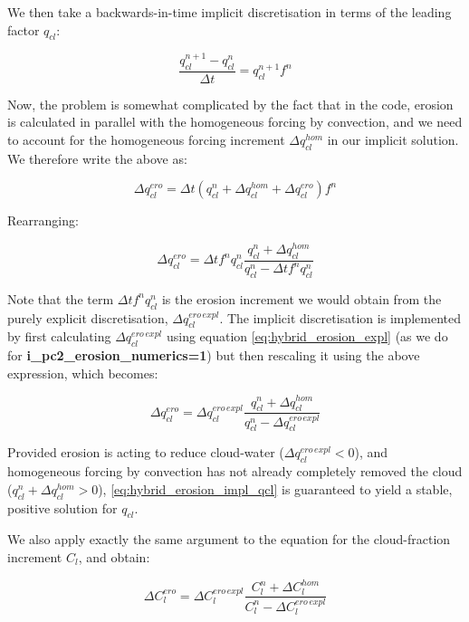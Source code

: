 \documentclass{UMDP_article}
\begin{document}
\begin{enumerate}
We then take a backwards-in-time implicit discretisation in terms of the
leading factor $q_{cl}$:

\[
\frac{ q_{cl}^{n+1} - q_{cl}^{n}}{\Delta t} = q_{cl}^{n+1} f^n
\]

Now, the problem is somewhat complicated by the fact that in the code,
erosion is calculated in parallel with the homogeneous forcing by convection,
and we need to account for the homogeneous forcing increment
$\Delta q_{cl}^{hom}$ in our implicit solution.  We therefore write the above as:

\[
\Delta q_{cl}^{ero} = \Delta t
                   ( q_{cl}^n + \Delta q_{cl}^{hom} + \Delta q_{cl}^{ero} ) f^n
\]

Rearranging:

\[
\Delta q_{cl}^{ero} = \Delta t f^n q_{cl}^n \frac{ q_{cl}^n + \Delta q_{cl}^{hom} }
                                           { q_{cl}^n - \Delta t f^n q_{cl}^n }
\]

Note that the term $\Delta t f^n q_{cl}^n$ is the erosion increment
we would obtain from the purely explicit discretisation,
$\Delta q_{cl}^{ero\,expl}$.  The implicit discretisation is implemented by
first calculating $\Delta q_{cl}^{ero\,expl}$ using equation
\ref{eq:hybrid_erosion_expl}
(as we do for \textbf{i\_pc2\_erosion\_numerics=1})
but then rescaling it using the above expression, which becomes:

\begin{equation}
\Delta q_{cl}^{ero} = \Delta q_{cl}^{ero\,expl} \frac{ q_{cl}^n + \Delta q_{cl}^{hom} }
                                           { q_{cl}^n - \Delta q_{cl}^{ero\,expl} }
\label{eq:hybrid_erosion_impl_qcl} \end{equation}

Provided erosion is acting to reduce cloud-water ($\Delta q_{cl}^{ero\,expl} < 0$),
and homogeneous forcing by convection has not already completely removed
the cloud ($q_{cl}^n + \Delta q_{cl}^{hom} > 0$), \ref{eq:hybrid_erosion_impl_qcl}
is guaranteed to yield a stable, positive solution for $q_{cl}$.

We also apply exactly the same argument to the equation for the cloud-fraction
increment $C_l$, and obtain:

\begin{equation}
\Delta C_l^{ero} = \Delta C_l^{ero\,expl} \frac{ C_l^n + \Delta C_l^{hom} }
                                           { C_l^n - \Delta C_l^{ero\,expl} }
\label{eq:hybrid_erosion_impl_Cl} \end{equation}


\end{enumerate}
\end{document}
